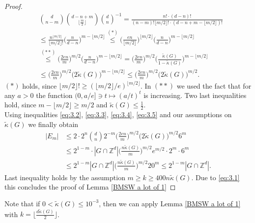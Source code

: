 \documentclass[a4paper,oneside, reqno]{amsart}
\numberwithin{equation}{section}
\theoremstyle{definition}%
\theoremstyle{definition}
\theoremstyle{definition}%
\theoremstyle{definition}
\begin{document}
\begin{proof}
\begin{equation}
\begin{split}
        &\binom{d}{n-m} \binom{d-n+m}{\lfloor \frac{m}{2} \rfloor} \binom{d}{n}^{-1} = \frac{n! \cdot (d-n)!}{(n-m)! \lfloor m/2 \rfloor! \cdot (d-n+m-\lfloor m/2 \rfloor)!}  \\
        &\leq \frac{n^{\lfloor m/2 \rfloor}}{\lfloor m/2 \rfloor!} \Big( \frac{n}{d-n} \Big)^{m-\lfloor m/2 \rfloor} \stackrel{(*)}{\leq} \Big( \frac{en}{\lfloor m/2 \rfloor} \Big)^{\lfloor m/2 \rfloor} \Big( \frac{n}{d-n} \Big)^{m-\lfloor m/2 \rfloor}  \\ 
        &\stackrel{(**)}{\leq} \Big( \frac{2en}{m} \Big)^{ m/2 } \Big( \frac{n}{d-n} \Big)^{m-\lfloor m/2 \rfloor}= \Big( \frac{2en}{m} \Big)^{ m/2 } \Big( \frac{\widetilde{\kappa}(G)}{1-\widetilde{\kappa}(G)} \Big)^{m-\lfloor m/2 \rfloor}  \\
    &\leq \Big( \frac{2en}{m} \Big)^{ m/2 } \Big( 2\widetilde{\kappa}(G) \Big)^{m-\lfloor m/2 \rfloor} \leq \Big( \frac{2 en}{m} \Big)^{ m/2 } \Big( 2\widetilde{\kappa}(G) \Big)^{m/2}.
    \end{split}
\end{equation} 
$(*)$ holds, since $\lfloor m/2 \rfloor! \geq (\lfloor m/2 \rfloor/e)^{\lfloor m/2 \rfloor}$. In $(**)$ we used the fact that for any $a>0$ the function $(0,a/e] \ni t \mapsto (a/t)^t$ is increasing. Two last inequalities hold, since $m-\lfloor m/2 \rfloor \geq m/2$ and $\widetilde{\kappa}(G) \le \frac{1}{2}$. \\
Using inequalities \eqref{eq:3.2}, \eqref{eq:3.3}, \eqref{eq:3.4}, \eqref{eq:3.5} and our assumptions on $\widetilde{\kappa}(G)$ we finally obtain
\begin{equation*} 
\begin{split}    
|E_m| &\leq 2 \cdot2^n \binom{d}{n} 2^{-m}  \Big( \frac{2en}{m} \Big)^{ m/2 } \Big( 2\widetilde{\kappa}(G) \Big)^{m/2} 6^m \\
 &\leq  2^{1-m}  \cdot |G \cap \mathbb{Z}^d| \Big(\frac{n\widetilde{\kappa}(G)}{m}\Big)^{m/2} e^{m/2} \cdot 2^{m} \cdot  6^m\\
 &\leq  2^{1-m} |G \cap \mathbb{Z}^d| \Big(\frac{n\widetilde{\kappa}(G)}{m}\Big)^{m/2} 20^m \leq  2^{1-m} |G \cap \mathbb{Z}^d|.
 \end{split}
 \end{equation*}
Last inequality holds by the assumption $m \geq k \geq 400n \widetilde{\kappa}(G) $. Due to \eqref{eq:3.1} this concludes the proof of Lemma \ref{BMSW a lot of 1}
\end{proof}
Note that if $0<\widetilde{\kappa}(G) \le 10^{-3}$, then we can apply Lemma \ref{BMSW a lot of 1} with $k=\lfloor \frac{d \widetilde{\kappa}(G)}{2} \rfloor$.
\end{document}
